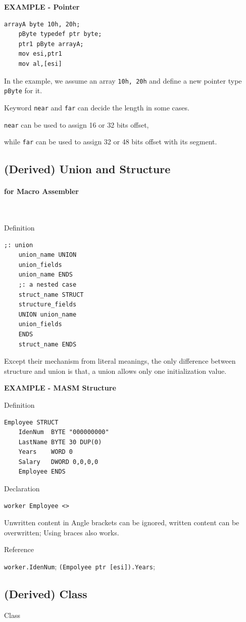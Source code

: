 \textbf{EXAMPLE - Pointer}

\lstset{style=GlobalASMx86}
\begin{lstlisting}[language={[x86masm]Assembler}]
	arrayA byte 10h, 20h;
	pByte typedef ptr byte;
	ptr1 pByte arrayA;
	mov esi,ptr1
	mov al,[esi]
\end{lstlisting}

In the example, we assume an array \verb|10h, 20h| and define a new pointer type \verb|pByte| for it.

Keyword \verb|near| and \verb|far| can decide the length in some cases.

\verb|near| can be used to assign 16 or 32 bits offset,

while \verb|far| can be used to assign 32 or 48 bits offset with its segment.



\subsection{(Derived) Union and Structure}



\paragraph{for Macro Assembler} \

Definition

\begin{lstlisting}[language={[x86masm]Assembler}]
	;: union
	union_name UNION
	union_fields
	union_name ENDS
	;: a nested case
	struct_name STRUCT
	structure_fields
	UNION union_name
	union_fields
	ENDS
	struct_name ENDS
\end{lstlisting}

Except their mechanism from literal meanings, the only difference between structure and union is that, a union allows only one initialization value.

\textbf{EXAMPLE - MASM Structure}

Definition

\begin{lstlisting}[language={[x86masm]Assembler}]
	Employee STRUCT
	IdenNum  BYTE "000000000"
	LastName BYTE 30 DUP(0)
	Years    WORD 0
	Salary   DWORD 0,0,0,0
	Employee ENDS
\end{lstlisting}

Declaration

\begin{lstlisting}[language={[x86masm]Assembler}]
	worker Employee <>
\end{lstlisting}

Unwritten content in Angle brackets can be ignored, written content can be overwritten; Using braces also works.

Reference

\verb|worker.IdenNum|; \verb|(Empolyee ptr [esi]).Years|;



\subsection{(Derived) Class}

{Class}

